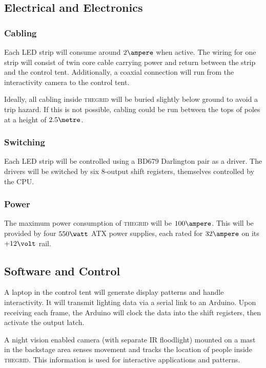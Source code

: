 \documentclass[12pt]{article} %
\newcommand{\thegrid}{\textsc{the\textperiodcentered grid}\xspace}
\begin{document}
\subsection{Electrical and Electronics}
\subsubsection{Cabling}
Each LED strip will consume around $2\ampere$ when active.  The wiring for one strip will consist of twin core cable carrying power and return between the strip and the control tent.  Additionally, a coaxial connection will run from the interactivity camera to the control tent.

Ideally, all cabling inside \thegrid will be buried slightly below ground to avoid a trip hazard.  If this is not possible, cabling could be run between the tops of poles at a height of $2.5\metre$.

\subsubsection{Switching}
Each LED strip will be controlled using a BD679 Darlington pair as a driver.  The drivers will be switched by six 8-output shift registers, themselves controlled by the CPU.

\subsubsection{Power}
The maximum power consumption of \thegrid will be $100\ampere$.  This will be provided by four $550\watt$ ATX power supplies, each rated for $32\ampere$ on its $+12\volt$ rail.

\subsection{Software and Control}
A laptop in the control tent will generate display patterns and handle interactivity.  It will transmit lighting data via a serial link to an Arduino.  Upon receiving each frame, the Arduino will clock the data into the shift registers, then activate the output latch.

A night vision enabled camera (with separate IR floodlight) mounted on a mast in the backstage area senses movement and tracks the location of people inside \thegrid.  This information is used for interactive applications and patterns.

\end{document}
